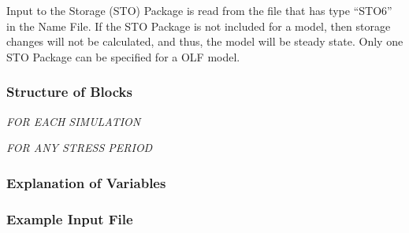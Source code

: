 Input to the Storage (STO) Package is read from the file that has type ``STO6'' in the Name File.  If the STO Package is not included for a model, then storage changes will not be calculated, and thus, the model will be steady state.  Only one STO Package can be specified for a OLF model.

\vspace{5mm}
\subsubsection{Structure of Blocks}

\vspace{5mm}
\noindent \textit{FOR EACH SIMULATION}

\vspace{5mm}
\noindent \textit{FOR ANY STRESS PERIOD}


\vspace{5mm}
\subsubsection{Explanation of Variables}
\begin{description}

\end{description}

\vspace{5mm}
\subsubsection{Example Input File}


